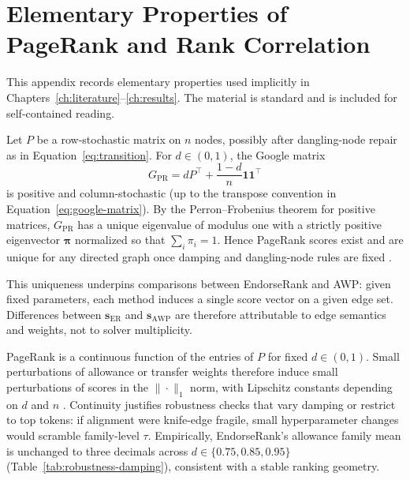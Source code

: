 \section{Elementary Properties of PageRank and Rank Correlation}
\label{ch:appendix-theory}

This appendix records elementary properties used implicitly in Chapters~\ref{ch:literature}--\ref{ch:results}. The material is standard  and is included for self-contained reading.


Let $P$ be a row-stochastic matrix on $n$ nodes, possibly after dangling-node repair as in Equation~\eqref{eq:transition}. For $d\in(0,1)$, the Google matrix
\[
G_{\mathrm{PR}}=d P^{\top}+\frac{1-d}{n}\mathbf{1}\mathbf{1}^{\top}
\]
is positive and column-stochastic (up to the transpose convention in Equation~\eqref{eq:google-matrix}). By the Perron--Frobenius theorem for positive matrices, $G_{\mathrm{PR}}$ has a unique eigenvalue of modulus one with a strictly positive eigenvector $\boldsymbol{\pi}$ normalized so that $\sum_i\pi_i=1$. Hence PageRank scores exist and are unique for any directed graph once damping and dangling-node rules are fixed .

This uniqueness underpins comparisons between EndorseRank and AWP: given fixed parameters, each method induces a single score vector on a given edge set. Differences between $\mathbf{s}_{\mathrm{ER}}$ and $\mathbf{s}_{\mathrm{AWP}}$ are therefore attributable to edge semantics and weights, not to solver multiplicity.


PageRank is a continuous function of the entries of $P$ for fixed $d\in(0,1)$. Small perturbations of allowance or transfer weights therefore induce small perturbations of scores in the $\|\cdot\|_1$ norm, with Lipschitz constants depending on $d$ and $n$ . Continuity justifies robustness checks that vary damping or restrict to top tokens: if alignment were knife-edge fragile, small hyperparameter changes would scramble family-level $\tau$. Empirically, EndorseRank's allowance family mean is unchanged to three decimals across $d\in\{0.75,0.85,0.95\}$ (Table~\ref{tab:robustness-damping}), consistent with a stable ranking geometry.


